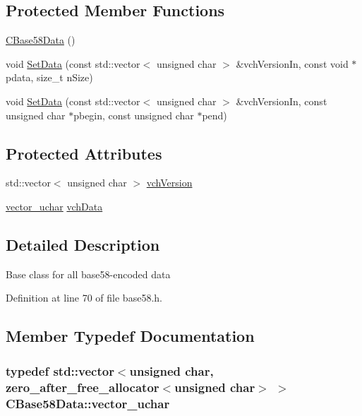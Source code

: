 \subsection*{Protected Member Functions}
\begin{DoxyCompactItemize}
\item 
\hyperlink{class_c_base58_data_ae4f4ff42010299bc6fb228e21d6b2a15}{C\+Base58\+Data} ()
\item 
void \hyperlink{class_c_base58_data_afab1c06a0a4f631fd889434a2bc48c27}{Set\+Data} (const std\+::vector$<$ unsigned char $>$ \&vch\+Version\+In, const void $\ast$pdata, size\+\_\+t n\+Size)
\item 
void \hyperlink{class_c_base58_data_a8314b00685e590b4005be5cdfd36aeb9}{Set\+Data} (const std\+::vector$<$ unsigned char $>$ \&vch\+Version\+In, const unsigned char $\ast$pbegin, const unsigned char $\ast$pend)
\end{DoxyCompactItemize}
\subsection*{Protected Attributes}
\begin{DoxyCompactItemize}
\item 
std\+::vector$<$ unsigned char $>$ \hyperlink{class_c_base58_data_a110c1008f399053098a1bdf63408e923}{vch\+Version}
\item 
\hyperlink{class_c_base58_data_a193d64487a0b4f6df24f8bd380956ec1}{vector\+\_\+uchar} \hyperlink{class_c_base58_data_ae7ef7dfb93683aa4aaee8b74da5abb9c}{vch\+Data}
\end{DoxyCompactItemize}


\subsection{Detailed Description}
Base class for all base58-\/encoded data 

Definition at line 70 of file base58.\+h.



\subsection{Member Typedef Documentation}
\hypertarget{class_c_base58_data_a193d64487a0b4f6df24f8bd380956ec1}{}
\subsubsection[{vector\+\_\+uchar}]{\setlength{\rightskip}{0pt plus 5cm}typedef std\+::vector$<$unsigned char, {\bf zero\+\_\+after\+\_\+free\+\_\+allocator}$<$unsigned char$>$ $>$ {\bf C\+Base58\+Data\+::vector\+\_\+uchar}\hspace{0.3cm}{\ttfamily [protected]}}\label{class_c_base58_data_a193d64487a0b4f6df24f8bd380956ec1}


